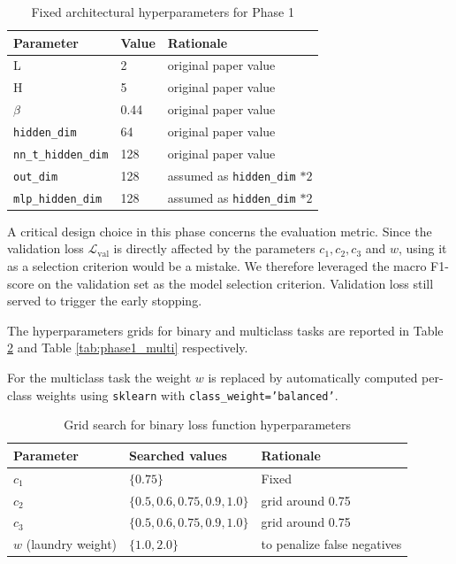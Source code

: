 \begin{table}
\centering
\begin{tabular}{l l l}
\hline
\textbf{Parameter} & \textbf{Value} & \textbf{Rationale} \\
\hline
L & 2 &  original paper value \\
H & 5 &  original paper value \\
\(\beta\) & 0.44 & original paper value \\
\texttt{hidden\_dim} & 64 & original paper value \\
\texttt{nn\_t\_hidden\_dim} & 128 & original paper value \\
\texttt{out\_dim} & 128 & assumed as \texttt{hidden\_dim} \(* 2\) \\
\texttt{mlp\_hidden\_dim} & 128 & assumed as \texttt{hidden\_dim} \(* 2\)\\
\hline
\end{tabular}
\caption{Fixed architectural hyperparameters for Phase 1}
\label{tab:fixed_arch_hp}
\end{table}

A critical design choice in this phase concerns the evaluation metric. Since the validation loss $\mathcal{L}_{\text{val}}$ is directly affected by the parameters \(c_1,c_2,c_3\) and \(w\), using it as a selection criterion would be a mistake. We therefore leveraged the macro F1-score on the validation set as the model selection criterion. Validation loss still served to trigger the early stopping.

The hyperparameters grids for binary and multiclass tasks are reported in Table \ref{tab:phase1_binary} and Table \ref{tab:phase1_multi} respectively.

For the multiclass task the weight $w$ is replaced by automatically computed per-class weights using \texttt{sklearn} with \texttt{class\_weight='balanced'}.

\begin{table}
\centering
\begin{tabular}{l l l}
\hline
\textbf{Parameter} & \textbf{Searched values} & \textbf{Rationale} \\
\hline
$c_1$ & $\{0.75\}$ & Fixed \\
$c_2$ & $\{0.5, 0.6, 0.75, 0.9, 1.0\}$ & grid around 0.75 \\
$c_3$ & $\{0.5, 0.6, 0.75, 0.9, 1.0\}$ & grid around 0.75 \\
$w$ (laundry weight) & $\{1.0, 2.0\}$ & to penalize false negatives \\
\hline
\end{tabular}
\caption{Grid search for binary loss function hyperparameters}
\label{tab:phase1_binary}
\end{table}

